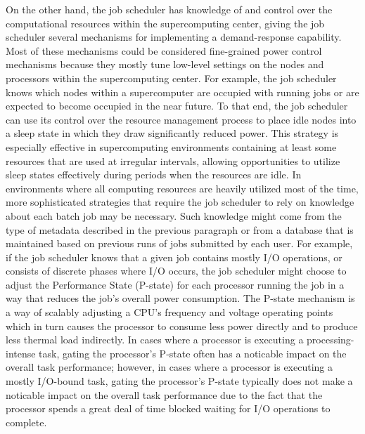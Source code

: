 On the other hand, the job scheduler has knowledge of and control over
the computational resources within the supercomputing center, giving
the job scheduler several mechanisms for implementing a
demand-response capability.  Most of these mechanisms could be
considered fine-grained power control mechanisms because they mostly
tune low-level settings on the nodes and processors within the
supercomputing center.  For example, the job scheduler knows which
nodes within a supercomputer are occupied with running jobs or are
expected to become occupied in the near future.  To that end, the job
scheduler can use its control over the resource management process to
place idle nodes into a sleep state in which they draw significantly
reduced power.  This strategy is especially effective in
supercomputing environments containing at least some resources that
are used at irregular intervals, allowing opportunities to utilize
sleep states effectively during periods when the resources are idle.
In environments where all computing resources are heavily utilized
most of the time, more sophisticated strategies that require the job
scheduler to rely on knowledge about each batch job may be necessary.
Such knowledge might come from the type of metadata described in the
previous paragraph or from a database that is maintained based on
previous runs of jobs submitted by each user.  For example, if the job
scheduler knows that a given job contains mostly I/O operations, or
consists of discrete phases where I/O occurs, the job scheduler might
choose to adjust the Performance State (P-state) for each processor
running the job in a way that reduces the job's overall power
consumption.  The P-state mechanism is a way of scalably adjusting a
CPU's frequency and voltage operating points which in turn causes the
processor to consume less power directly and to produce less thermal
load indirectly.  In cases where a processor is executing a
processing-intense task, gating the processor's P-state often has a
noticable impact on the overall task performance; however, in cases
where a processor is executing a mostly I/O-bound task, gating the
processor's P-state typically does not make a noticable impact on the
overall task performance due to the fact that the processor spends a
great deal of time blocked waiting for I/O operations to complete.

